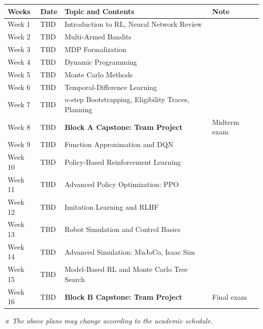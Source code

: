 \documentclass[11pt,a4paper]{article}
\begin{document}
{\small
\begin{tabular}{|p{1.6cm}|p{1.6cm}|p{7.3cm}|p{5.6cm}|}
\hline
\rowcolor{hdrgray}\textbf{Weeks} & \textbf{Date} & \textbf{Topic and Contents} & \textbf{Note} \\
\hline
Week 1 & TBD & Introduction to RL, Neural Network Review & \\
\hline
Week 2 & TBD & Multi-Armed Bandits & \\
\hline
Week 3 & TBD & MDP Formalization & \\
\hline
Week 4 & TBD & Dynamic Programming & \\
\hline
Week 5 & TBD & Monte Carlo Methods & \\
\hline
Week 6 & TBD & Temporal-Difference Learning & \\
\hline
Week 7 & TBD & $n$-step Bootstrapping, Eligibility Traces, Planning & \\
\hline
Week 8 & TBD & \textbf{Block A Capstone: Team Project} & Midterm exam \\
\hline
Week 9 & TBD & Function Approximation and DQN & \\
\hline
Week 10 & TBD & Policy-Based Reinforcement Learning & \\
\hline
Week 11 & TBD & Advanced Policy Optimization: PPO & \\
\hline
Week 12 & TBD & Imitation Learning and RLHF & \\
\hline
Week 13 & TBD & Robot Simulation and Control Basics & \\
\hline
Week 14 & TBD & Advanced Simulation: MuJoCo, Isaac Sim & \\
\hline
Week 15 & TBD & Model-Based RL and Monte Carlo Tree Search & \\
\hline
Week 16 & TBD & \textbf{Block B Capstone: Team Project} & Final exam \\
\hline
\end{tabular}
}

\vspace{2mm}
\textit{※ The above plans may change according to the academic schedule.}
\end{document}
